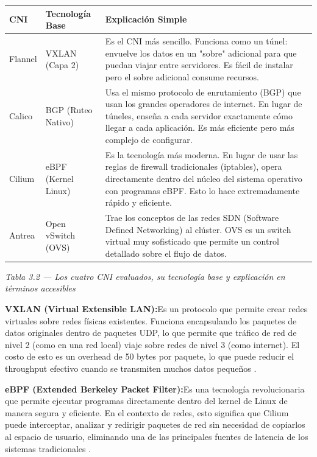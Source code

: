 \documentclass[journal]{IEEEtran}
\begin{document}
\begin{table}[htbp]
\centering
\scriptsize
\begin{tabularx}{\textwidth}{|Y|Y|Y|}
\hline
\textbf{CNI} & \textbf{Tecnología Base} & \textbf{Explicación Simple} \\
\hline
Flannel & VXLAN (Capa 2) & Es el CNI más sencillo. Funciona como un túnel: envuelve los datos en un "sobre" adicional para que puedan viajar entre servidores. Es fácil de instalar pero el sobre adicional consume recursos. \\
Calico & BGP (Ruteo Nativo) & Usa el mismo protocolo de enrutamiento (BGP) que usan los grandes operadores de internet. En lugar de túneles, enseña a cada servidor exactamente cómo llegar a cada aplicación. Es más eficiente pero más complejo de configurar. \\
Cilium & eBPF (Kernel Linux) & Es la tecnología más moderna. En lugar de usar las reglas de firewall tradicionales (iptables), opera directamente dentro del núcleo del sistema operativo con programas eBPF. Esto lo hace extremadamente rápido y eficiente. \\
Antrea & Open vSwitch (OVS) & Trae los conceptos de las redes SDN (Software Defined Networking) al clúster. OVS es un switch virtual muy sofisticado que permite un control detallado sobre el flujo de datos. \\
\hline
\end{tabularx}
\end{table}

\begin{center}\emph{\emph{Tabla 3.2 --- Los cuatro CNI evaluados, su tecnología base y explicación en términos accesibles}}\end{center}

\textbf{VXLAN (Virtual Extensible LAN):}Es un protocolo que permite crear redes virtuales sobre redes físicas existentes. Funciona encapsulando los paquetes de datos originales dentro de paquetes UDP, lo que permite que tráfico de red de nivel 2 (como en una red local) viaje sobre redes de nivel 3 (como internet). El costo de esto es un overhead de 50 bytes por paquete, lo que puede reducir el throughput efectivo cuando se transmiten muchos datos pequeños \cite{ref12}.

\textbf{eBPF (Extended Berkeley Packet Filter):}Es una tecnología revolucionaria que permite ejecutar programas directamente dentro del kernel de Linux de manera segura y eficiente. En el contexto de redes, esto significa que Cilium puede interceptar, analizar y redirigir paquetes de red sin necesidad de copiarlos al espacio de usuario, eliminando una de las principales fuentes de latencia de los sistemas tradicionales \cite{ref11}.
\end{document}
